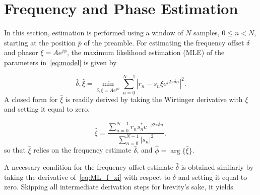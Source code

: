 \section{Frequency and Phase Estimation}%
\label{sec:freq_est}   

In this section, estimation is performed using a window of $N$ samples, $0\leq n<N$, starting
at the position $\bar{p}$ of the preamble.
For estimating the frequency offset $\delta$ and phasor $\xi=Ae^{j\phi}$, the maximum likelihood estimation (MLE) of the parameters in~\eqref{eq:model} is given by

\begin{equation}
    \label{eq:ML_f_xi}
      \hat{\delta},\hat{\xi}=\min_{\delta,\xi=Ae^{j\phi}}\sum_{n=0}^{N-1}|r_n-s_n\xi e^{j2\pi\delta n}|^{2}.
    \end{equation}
A closed form for $\hat{\xi}$ is readily derived by taking the Wirtinger derivative with $\xi$ and setting it equal to zero,

\begin{equation}
    \label{eq:opt_xi}
    \hat{\xi}=\frac{\sum_{n=0}^{N-1}{r_{n}s_n^{*}e^{-j2\pi\hat{\delta} n}}}{\sum_{n=0}^{N-1}|s_{n}|^2},
  \end{equation}
so that $\hat{\xi}$ relies on the frequency estimate $\hat{\delta}$, and $\hat{\phi}=\arg\{\hat{\xi}\}$. 


A necessary condition for the frequency offset estimate $\hat{\delta}$
is obtained similarly by taking the derivative of~\eqref{eq:ML_f_xi} with respect to
$\delta$ and setting it equal to zero. Skipping all intermediate derivation steps for brevity's sake,
it yields

